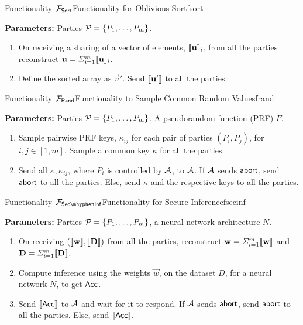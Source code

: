 \begin{protofig}{Functionality $\mathcal{F}_{\mathsf{Sort}}$}{Functionality for Oblivious Sort}{fsort}

\textbf{Parameters:} Parties $\mathcal{P}_{} = \{P_1, \ldots, P_m\}$.

\begin{enumerate}
    \item On receiving a sharing of a vector of elements, $\llbracket {\ensuremath{\mathbf{u}}}\rrbracket_i$, from all the parties reconstruct ${\mathbf{u}} = \Sigma_{i = 1}^m \llbracket {\ensuremath{\mathbf{u}}}\rrbracket_i$.
    \item Define the sorted array as $\vec u'$. Send $\llbracket {\ensuremath{\mathbf{u}}}'\rrbracket$ to all the parties.
\end{enumerate}
    
\end{protofig}

\begin{protofig}{Functionality $\mathcal{F}_{\mathsf{Rand}}$}{Functionality to Sample Common Random Values}{frand}

\textbf{Parameters:} Parties $\mathcal{P}_{} = \{P_1, \ldots, P_m\}$. A pseudorandom function (PRF) $F$.

\begin{enumerate}
    \item Sample pairwise PRF keys, $\kappa_{ij}$ for each pair of parties $(P_i, P_j)$, for $i, j \in [1, m]$. Sample a common key $\kappa$ for all the parties.
    \item Send all $\kappa, \kappa_{ij}$, where $P_i$ is controlled by $\mathcal{A}$, to $\mathcal{A}$. If $\mathcal{A}$ sends $\mathsf{abort}$, send $\mathsf{abort}$ to all the parties. Else, send $\kappa$ and the respective keys to all the parties.
\end{enumerate}
    
\end{protofig}

\begin{protofig}{Functionality $\FSecInf$}{Functionality for Secure Inference}{fsecinf}

\textbf{Parameters:} Parties $\mathcal{P}_{} = \{P_1, \ldots, P_m\}$, a neural network architecture $N$.

\begin{enumerate}
    \item On receiving $(\llbracket {\ensuremath{\mathbf{w}}}\rrbracket, \llbracket {\ensuremath{\mathbf{D}}}\rrbracket)$ from all the parties, reconstruct ${\mathbf{w}} = \Sigma_{i = 1}^m \llbracket {\ensuremath{\mathbf{w}}}\rrbracket$ and ${\mathbf{D}} = \Sigma_{i = 1}^m \llbracket {\ensuremath{\mathbf{D}}}\rrbracket$.
    \item Compute inference using the weights $\vec w$, on the dataset $D$, for a neural network $N$, to get $\mathsf{Acc}$.
    \item Send $\llbracket \mathsf{Acc}\rrbracket$ to $\mathcal{A}$ and wait for it to respond. If $\mathcal{A}$ sends $\mathsf{abort}$, send $\mathsf{abort}$ to all the parties. Else, send $\llbracket \mathsf{Acc}\rrbracket$.
\end{enumerate} 
    
\end{protofig}

